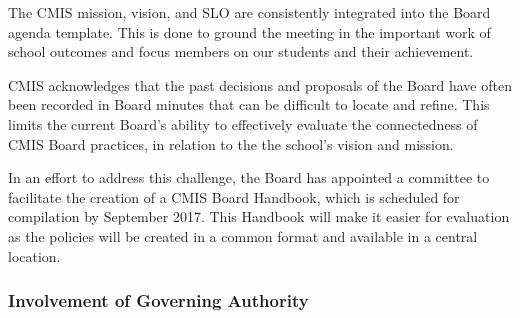 \begin{findings}
The CMIS mission, vision, and SLO are consistently integrated into the Board agenda template. This is done to ground the meeting in the important work of school outcomes and focus members on our students and their achievement. 


CMIS acknowledges that the past decisions and proposals of the Board have often been recorded in Board minutes that can be difficult to locate and refine. This limits the current Board’s ability to effectively evaluate the connectedness of CMIS Board practices, in relation to the the school’s vision and mission.

In an effort to address this challenge, the Board has appointed a committee to facilitate the creation of a CMIS Board Handbook, which is scheduled for compilation by September 2017. This Handbook will make it easier for evaluation as the policies will be created in a common format and available in a central location. 
\end{findings}

\subsubsection{Involvement of Governing Authority}



